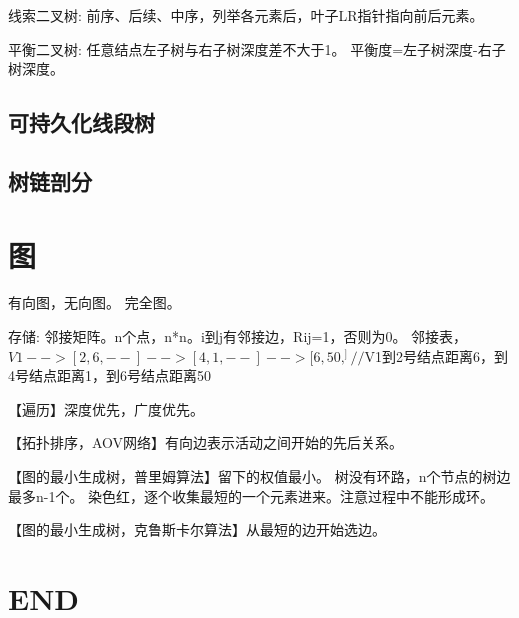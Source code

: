 \documentclass[UTF8]{../../computerUniverse}
\begin{document}
线索二叉树: 前序、后续、中序，列举各元素后，叶子LR指针指向前后元素。

平衡二叉树: 
任意结点左子树与右子树深度差不大于1。
平衡度=左子树深度-右子树深度。

\section{可持久化线段树}
\section{树链剖分}


\chapter{图}
有向图，无向图。
完全图。

存储: 
邻接矩阵。n个点，n*n。i到j有邻接边，Rij=1，否则为0。
邻接表，$V1-->[2,6,--]-->[4,1,--]-->[6,50,^]//$V1到2号结点距离6，到4号结点距离1，到6号结点距离50

【遍历】深度优先，广度优先。

【拓扑排序，AOV网络】有向边表示活动之间开始的先后关系。

【图的最小生成树，普里姆算法】留下的权值最小。
树没有环路，n个节点的树边最多n-1个。
染色红，逐个收集最短的一个元素进来。注意过程中不能形成环。

【图的最小生成树，克鲁斯卡尔算法】从最短的边开始选边。







\chapter{END}
\end{document}
